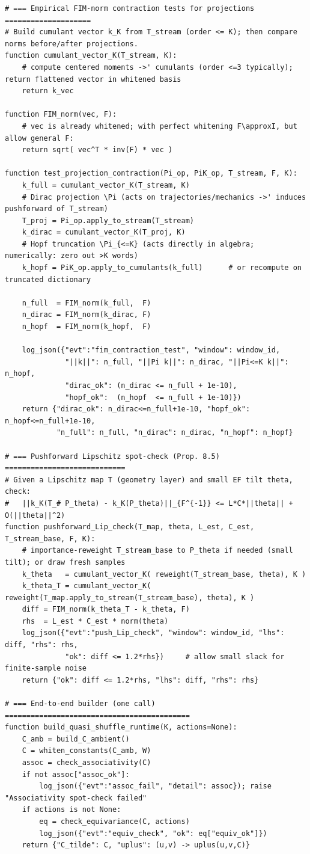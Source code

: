 \begin{lstlisting}
# === Empirical FIM-norm contraction tests for projections ====================
# Build cumulant vector k_K from T_stream (order <= K); then compare norms before/after projections.
function cumulant_vector_K(T_stream, K):
    # compute centered moments ->' cumulants (order <=3 typically); return flattened vector in whitened basis
    return k_vec

function FIM_norm(vec, F):
    # vec is already whitened; with perfect whitening F\approxI, but allow general F:
    return sqrt( vec^T * inv(F) * vec )

function test_projection_contraction(Pi_op, PiK_op, T_stream, F, K):
    k_full = cumulant_vector_K(T_stream, K)
    # Dirac projection \Pi (acts on trajectories/mechanics ->' induces pushforward of T_stream)
    T_proj = Pi_op.apply_to_stream(T_stream)
    k_dirac = cumulant_vector_K(T_proj, K)
    # Hopf truncation \Pi_{<=K} (acts directly in algebra; numerically: zero out >K words)
    k_hopf = PiK_op.apply_to_cumulants(k_full)      # or recompute on truncated dictionary

    n_full  = FIM_norm(k_full,  F)
    n_dirac = FIM_norm(k_dirac, F)
    n_hopf  = FIM_norm(k_hopf,  F)

    log_json({"evt":"fim_contraction_test", "window": window_id,
              "||k||": n_full, "||Pi k||": n_dirac, "||Pi<=K k||": n_hopf,
              "dirac_ok": (n_dirac <= n_full + 1e-10),
              "hopf_ok":  (n_hopf  <= n_full + 1e-10)})
    return {"dirac_ok": n_dirac<=n_full+1e-10, "hopf_ok": n_hopf<=n_full+1e-10,
            "n_full": n_full, "n_dirac": n_dirac, "n_hopf": n_hopf}

# === Pushforward Lipschitz spot-check (Prop. 8.5) ============================
# Given a Lipschitz map T (geometry layer) and small EF tilt theta, check:
#   ||k_K(T_# P_theta) - k_K(P_theta)||_{F^{-1}} <= L*C*||theta|| + O(||theta||^2)
function pushforward_Lip_check(T_map, theta, L_est, C_est, T_stream_base, F, K):
    # importance-reweight T_stream_base to P_theta if needed (small tilt); or draw fresh samples
    k_theta   = cumulant_vector_K( reweight(T_stream_base, theta), K )
    k_theta_T = cumulant_vector_K( reweight(T_map.apply_to_stream(T_stream_base), theta), K )
    diff = FIM_norm(k_theta_T - k_theta, F)
    rhs  = L_est * C_est * norm(theta)
    log_json({"evt":"push_Lip_check", "window": window_id, "lhs": diff, "rhs": rhs,
              "ok": diff <= 1.2*rhs})     # allow small slack for finite-sample noise
    return {"ok": diff <= 1.2*rhs, "lhs": diff, "rhs": rhs}

# === End-to-end builder (one call) ===========================================
function build_quasi_shuffle_runtime(K, actions=None):
    C_amb = build_C_ambient()
    C = whiten_constants(C_amb, W)
    assoc = check_associativity(C)
    if not assoc["assoc_ok"]:
        log_json({"evt":"assoc_fail", "detail": assoc}); raise "Associativity spot-check failed"
    if actions is not None:
        eq = check_equivariance(C, actions)
        log_json({"evt":"equiv_check", "ok": eq["equiv_ok"]})
    return {"C_tilde": C, "uplus": (u,v) -> uplus(u,v,C)}

\end{lstlisting}

